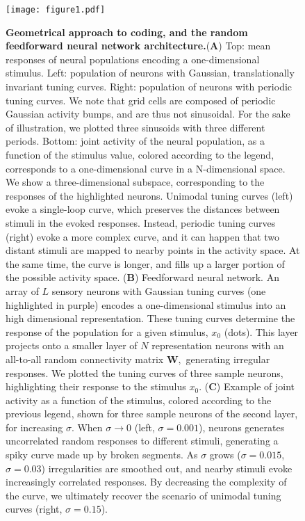 \documentclass[a4paper]{article}%
\begin{document}
\begin{figure}[ptb]
\centering
\texttt{[image: figure1.pdf]}
\caption{\textbf{Geometrical
approach to coding, and the random feedforward neural network architecture.}(\textbf{A}) Top:
mean responses of neural populations encoding a one-dimensional stimulus.
Left: population of neurons with Gaussian, translationally invariant tuning
curves. Right: population of neurons with periodic tuning curves. We note that grid cells are
composed of periodic Gaussian activity bumps, and are thus not sinusoidal. 
For the sake of illustration, we plotted three sinusoids with
three different periods. Bottom: joint activity of the neural population,
as a function of the stimulus value, colored according to the legend,
corresponds to a one-dimensional curve in a N-dimensional space. We show a three-dimensional
subspace, corresponding to the responses of the highlighted neurons. Unimodal
tuning curves (left) evoke a single-loop curve, which preserves the
distances between stimuli in the evoked responses. Instead, periodic tuning
curves (right) evoke a more complex curve, and it can happen that two
distant stimuli are mapped to nearby points in the activity space. At the same
time, the curve is longer, and fills up a larger portion of the possible activity space. (\textbf{B}) Feedforward neural
network. An array of  $L$  sensory neurons with Gaussian tuning curves (one highlighted in
purple) encodes a one-dimensional stimulus into an high dimensional
representation. These tuning curves determine the response of the population
for a given stimulus, $x_{0}$ (dots). This layer projects onto a smaller
layer of $N$ representation neurons with an all-to-all random connectivity matrix $\mathbf{W},$
generating irregular responses. We plotted the tuning curves of three sample
neurons, highlighting their response to the  stimulus $x_{0}$.
(\textbf{C}) Example of joint activity as a function of the stimulus, colored according to the previous legend, shown for three sample neurons of the
second layer, for increasing $\sigma$. When $\sigma\rightarrow0$ (left, $\sigma = 0.001$), 
neurons generates uncorrelated random responses to different stimuli,
generating a spiky curve made up by broken segments. As $\sigma$ grows ($\sigma = 0.015$, $\sigma=0.03$) 
irregularities are smoothed out, and nearby stimuli evoke increasingly
correlated responses. By decreasing the complexity of the curve, we
ultimately recover the scenario of unimodal tuning curves (right, $\sigma = 0.15$).}
\label{Fig:1}
\end{figure}\clearpage
\end{document}
